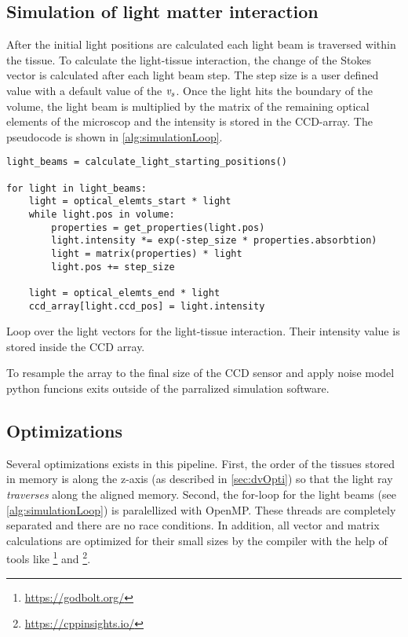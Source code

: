 \subsection{Simulation of light matter interaction}\label{sec:simLightTissue}
%
After the initial light positions are calculated each light beam is traversed within the tissue.
To calculate the light-tissue interaction, the change of the Stokes vector is calculated after each light beam step.
The step size is a user defined value with a default value of the \Voxelsize{} $\textnormal{$\mathit{v_{s}}$}$.
Once the light hits the boundary of the volume, the light beam is multiplied by the matrix of the remaining optical elements of the microscop and the intensity is stored in the \ac{CCD}-array.
The pseudocode is shown in \cref{alg:simulationLoop}.
%
\begin{lstfloat}[!tb]
\lstset{style=python}
\begin{lstlisting}[]
light_beams = calculate_light_starting_positions()

for light in light_beams:
    light = optical_elemts_start * light
    while light.pos in volume:
        properties = get_properties(light.pos)
        light.intensity *= exp(-step_size * properties.absorbtion)
        light = matrix(properties) * light
        light.pos += step_size
   
    light = optical_elemts_end * light
    ccd_array[light.ccd_pos] = light.intensity
\end{lstlisting}
\caption{Loop over the light vectors for the light-tissue interaction. Their intensity value is stored inside the \ac{CCD} array.}
\label{alg:simulationLoop}
\end{lstfloat}
%
To resample the array to the final size of the \ac{CCD} sensor and apply noise model python funcions exits outside of the parralized simulation software.
% 
% 
%
\subsection{Optimizations}
%
Several optimizations exists in this pipeline.
First, the order of the tissues stored in memory is along the z-axis (as described in \cref{sec:dvOpti}) so that the light ray \textit{traverses} along the aligned memory.
Second, the for-loop for the light beams (see \cref{alg:simulationLoop}) is paralellized with \ac{OpenMP}.
These threads are completely separated and there are no race conditions.
In addition, all vector and matrix calculations are optimized for their small sizes by the compiler with the help of tools like \footnote{\url{https://godbolt.org/}} and \footnote{\url{https://cppinsights.io/}}.
%
%
